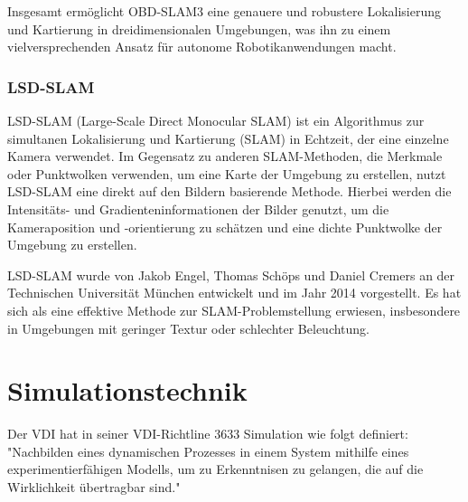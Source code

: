 Insgesamt ermöglicht OBD-SLAM3 eine genauere und robustere Lokalisierung und Kartierung in dreidimensionalen Umgebungen, was ihn zu einem vielversprechenden Ansatz für autonome Robotikanwendungen macht.

\subsubsection{LSD-SLAM}

LSD-SLAM (Large-Scale Direct Monocular SLAM) ist ein Algorithmus zur simultanen Lokalisierung und Kartierung (SLAM) in Echtzeit, der eine einzelne Kamera verwendet. Im Gegensatz zu anderen SLAM-Methoden, die Merkmale oder Punktwolken verwenden, um eine Karte der Umgebung zu erstellen, nutzt LSD-SLAM eine direkt auf den Bildern basierende Methode. Hierbei werden die Intensitäts- und Gradienteninformationen der Bilder genutzt, um die Kameraposition und -orientierung zu schätzen und eine dichte Punktwolke der Umgebung zu erstellen.

LSD-SLAM wurde von Jakob Engel, Thomas Schöps und Daniel Cremers an der Technischen Universität München entwickelt und im Jahr 2014 vorgestellt. Es hat sich als eine effektive Methode zur SLAM-Problemstellung erwiesen, insbesondere in Umgebungen mit geringer Textur oder schlechter Beleuchtung.



\section{Simulationstechnik} \label{simulationstechnik:section}
Der \ac{VDI} hat in seiner \ac{VDI}-Richtline 3633 Simulation wie folgt definiert: "Nachbilden eines dynamischen Prozesses in einem System mithilfe eines experimentierfähigen Modells, um zu Erkenntnisen zu gelangen, die auf die Wirklichkeit übertragbar sind." \cite{VDI-3633}


